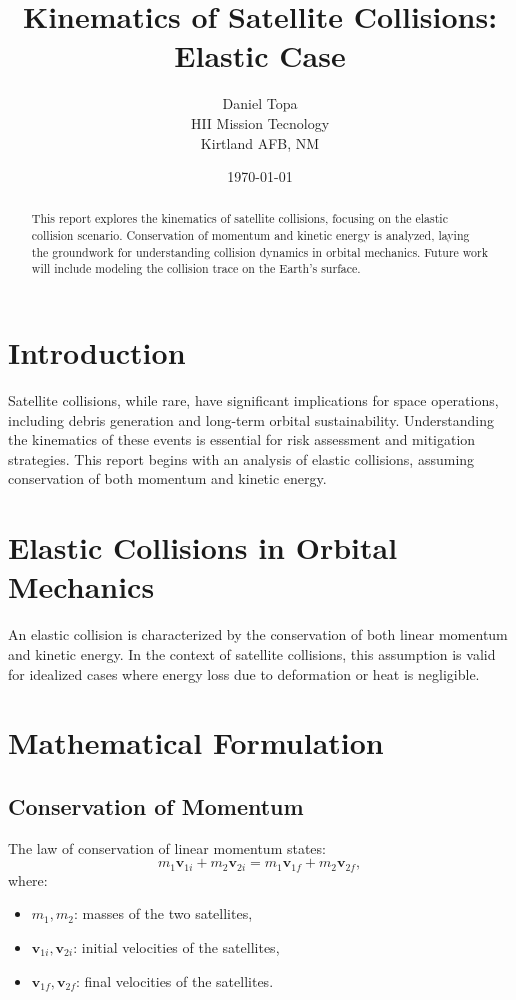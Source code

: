 \documentclass[12pt]{article}
\title{Kinematics of Satellite Collisions: Elastic Case}
\author{Daniel Topa\\HII Mission Tecnology\\Kirtland AFB, NM}%
\date{\today}
\begin{document}
\maketitle
\begin{abstract}
\tableofcontents
This report explores the kinematics of satellite collisions, focusing on the elastic collision scenario. Conservation of momentum and kinetic energy is analyzed, laying the groundwork for understanding collision dynamics in orbital mechanics. Future work will include modeling the collision trace on the Earth's surface.
\end{abstract}

\section{Introduction}
Satellite collisions, while rare, have significant implications for space operations, including debris generation and long-term orbital sustainability. Understanding the kinematics of these events is essential for risk assessment and mitigation strategies. This report begins with an analysis of elastic collisions, assuming conservation of both momentum and kinetic energy.

\section{Elastic Collisions in Orbital Mechanics}
An elastic collision is characterized by the conservation of both linear momentum and kinetic energy. In the context of satellite collisions, this assumption is valid for idealized cases where energy loss due to deformation or heat is negligible.

\section{Mathematical Formulation}

\subsection{Conservation of Momentum}
The law of conservation of linear momentum states:
\begin{equation}
    m_1 \mathbf{v}_{1i} + m_2 \mathbf{v}_{2i} = m_1 \mathbf{v}_{1f} + m_2 \mathbf{v}_{2f},
\end{equation}
where:
\begin{itemize}
    \item $m_1, m_2$: masses of the two satellites,
    \item $\mathbf{v}_{1i}, \mathbf{v}_{2i}$: initial velocities of the satellites,
    \item $\mathbf{v}_{1f}, \mathbf{v}_{2f}$: final velocities of the satellites.
\end{itemize}
\end{document}
